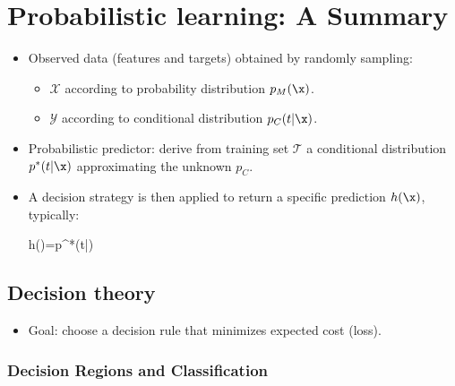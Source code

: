 \chapter{Probabilistic learning: A Summary}

\begin{itemize}
    \item Observed data (features and targets) obtained by randomly sampling:
    \begin{itemize}
        \item $\mathcal{X}$ according to probability distribution $p_M(\x)$.
        \item $\mathcal{Y}$ according to conditional distribution $p_C(t|\x)$.
    \end{itemize}
    \item Probabilistic predictor: derive from training set $\mathcal{T}$ a conditional distribution $p^*(t|\x)$ approximating the unknown $p_C$.
    \item A \alert{decision strategy} is then applied to return a specific prediction $h(\x)$, typically:
    \begin{myequation}
    h(\x)=p^*(t|\x)
    \end{myequation}
\end{itemize}

\section*{Decision theory}

\begin{itemize}
    \item Goal: choose a decision rule that minimizes \alert{expected cost} (loss).
\end{itemize}

\subsection*{Decision Regions and Classification}

